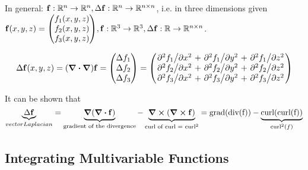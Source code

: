 In general: $\vb{f}: \mathbb{R}^n \to \mathbb{R}^n, \Delta\vb{f}:
\mathbb{R}^n\to\mathbb{R}^{n \times n}$, i.e. in three dimensions given
$\vb{f}(x,y,z) = \mqty(f_1(x,y,z)\\f_2(x,y,z)\\f_3(x,y,z)), \vb{f}:
\mathbb{R}^3\to\mathbb{R}^3, \Delta \vb{f}: \mathbb{R}\to\mathbb{R}^{n\times
n}$.

\begin{equation}
    \Delta\vb{f}(x, y, z) = (\grad\vdot\grad)\vb{f} = 
    \mqty(\Delta f_1 \\ \Delta f_2 \\ \Delta f_3) =
    \mqty(
        \pdv*[2]{f_1}{x} + \pdv*[2]{f_1}{y} + \pdv*[2]{f_1}{z}\\
        \pdv*[2]{f_2}{x} + \pdv*[2]{f_2}{y} + \pdv*[2]{f_2}{z}\\
        \pdv*[2]{f_3}{x} + \pdv*[2]{f_3}{y} + \pdv*[2]{f_3}{z}
    )
\end{equation}

It can be shown that
$$\underbrace{\Delta \vb{f}}_{vector Laplacian} = 
\underbrace{\grad(\div{\vb{f}})}_{\text{gradient of the divergence}} - 
\underbrace{\curl(\curl{\vb{f}})}_{\text{curl of curl = curl}^2} =
    \text{grad(div(f))} - \underbrace{\text{curl(curl(f))}}_{\text{curl}^2(f)}$$


\subsection*{Integrating Multivariable Functions}


